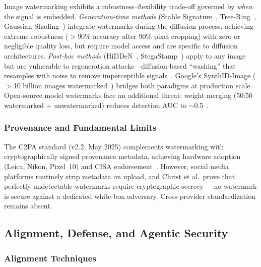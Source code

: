 Image watermarking exhibits a robustness--flexibility trade-off governed by \emph{when} the signal is embedded. \emph{Generation-time methods} (Stable Signature~\cite{fernandez2023stablesig}, Tree-Ring~\cite{wen2023treering}, Gaussian Shading~\cite{yang2024gaussianshading}) integrate watermarks during the diffusion process, achieving extreme robustness ($>$90\% accuracy after 90\% pixel cropping) with zero or negligible quality loss, but require model access and are specific to diffusion architectures. \emph{Post-hoc methods} (HiDDeN~\cite{zhu2018hidden}, StegaStamp~\cite{tancik2020stegastamp}) apply to any image but are vulnerable to regeneration attacks---diffusion-based ``washing'' that resamples with noise to remove imperceptible signals~\cite{zhao2023regeneration}. Google's SynthID-Image ($>$10 billion images watermarked~\cite{gowal2024synthidimage}) bridges both paradigms at production scale. Open-source model watermarks face an additional threat: weight merging (50:50 watermarked + unwatermarked) reduces detection AUC to $\sim$0.5~\cite{xu2025removal}.

\subsubsection{Provenance and Fundamental Limits}
\label{sec:provenance}

The C2PA standard (v2.2, May 2025) complements watermarking with cryptographically signed provenance metadata, achieving hardware adoption (Leica, Nikon, Pixel~10) and CISA endorsement~\cite{c2pa2025,cisa2025cc}. However, social media platforms routinely strip metadata on upload, and Christ et al.\ prove that perfectly undetectable watermarks require cryptographic secrecy~\cite{christ2024undetectable}---no watermark is secure against a dedicated white-box adversary. Cross-provider standardization remains absent.




\subsection{Alignment, Defense, and Agentic Security}
\label{sec:alignment}

\subsubsection{Alignment Techniques}
\label{sec:alignment-tech}

